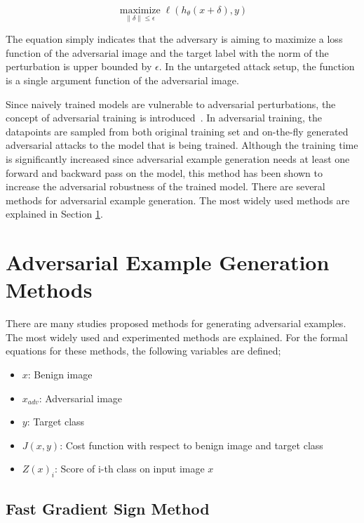 \begin{equation}
    \label{eqn:advattackeqn}
    \underset{\|\delta\| \leq \epsilon}{\operatorname{maximize}} \ell\left(h_{\theta}(x+\delta), y\right)
\end{equation}

The equation simply indicates that the adversary is aiming to maximize a loss function of the adversarial image and the target label with the norm of the perturbation is upper bounded by \(\epsilon\). In the untargeted attack setup, the function is a single argument function of the adversarial image.

Since naively trained models are vulnerable to adversarial perturbations, the concept of adversarial training is introduced~\cite{madry2017towards}. In adversarial training, the datapoints are sampled from both original training set and on-the-fly generated adversarial attacks to the model that is being trained. Although the training time is significantly increased since adversarial example generation needs at least one forward and backward pass on the model, this method has been shown to increase the adversarial robustness of the trained model. There are several methods for adversarial example generation. The most widely used methods are explained in Section \ref{section:methods}.

\section{Adversarial Example Generation Methods}\label{section:methods}
There are many studies proposed methods for generating adversarial examples. The most widely used and experimented methods are explained. For the formal equations for these methods, the following variables are defined;
\begin{itemize}
    \item \(x\): Benign image
    \item \(x_{adv}\): Adversarial image
    \item \(y\): Target class
    \item \(J(x, y)\): Cost function with respect to benign image and target class
    \item \(Z(x)_i\): Score of i-th class on input image \(x\)
\end{itemize}

\subsection{Fast Gradient Sign Method}

